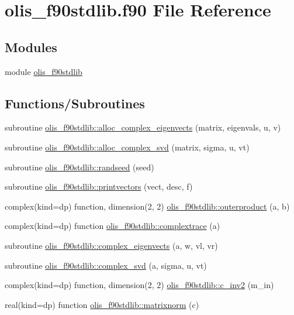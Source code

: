 \hypertarget{olis__f90stdlib_8f90}{}\section{olis\+\_\+f90stdlib.\+f90 File Reference}
\label{olis__f90stdlib_8f90}
\subsection*{Modules}
\begin{DoxyCompactItemize}
\item 
module \hyperlink{namespaceolis__f90stdlib}{olis\+\_\+f90stdlib}
\end{DoxyCompactItemize}
\subsection*{Functions/\+Subroutines}
\begin{DoxyCompactItemize}
\item 
subroutine \hyperlink{namespaceolis__f90stdlib_af0119bd404337367bc0727decf6dd89c}{olis\+\_\+f90stdlib\+::alloc\+\_\+complex\+\_\+eigenvects} (matrix, eigenvals, u, v)
\item 
subroutine \hyperlink{namespaceolis__f90stdlib_a31420ff7579f33919c00c26753b56612}{olis\+\_\+f90stdlib\+::alloc\+\_\+complex\+\_\+svd} (matrix, sigma, u, vt)
\item 
subroutine \hyperlink{namespaceolis__f90stdlib_a560e235cbabaf74da88a2ec97eda5628}{olis\+\_\+f90stdlib\+::randseed} (seed)
\item 
subroutine \hyperlink{namespaceolis__f90stdlib_a9780b39329025edfdef71ce07e250808}{olis\+\_\+f90stdlib\+::printvectors} (vect, desc, f)
\item 
complex(kind=dp) function, dimension(2, 2) \hyperlink{namespaceolis__f90stdlib_a9b646e61678500e78a9c48747a07bdf0}{olis\+\_\+f90stdlib\+::outerproduct} (a, b)
\item 
complex(kind=dp) function \hyperlink{namespaceolis__f90stdlib_aaa6e9aabcf33a6f7052e1db5aa5dcf70}{olis\+\_\+f90stdlib\+::complextrace} (a)
\item 
subroutine \hyperlink{namespaceolis__f90stdlib_a71c5b363b52932a5c69053149ac8cc25}{olis\+\_\+f90stdlib\+::complex\+\_\+eigenvects} (a, w, vl, vr)
\item 
subroutine \hyperlink{namespaceolis__f90stdlib_a81e060e6ecfde9524a9732349a818db3}{olis\+\_\+f90stdlib\+::complex\+\_\+svd} (a, sigma, u, vt)
\item 
complex(kind=dp) function, dimension(2, 2) \hyperlink{namespaceolis__f90stdlib_a162dd5131a39a62d7b95e2ebca4664a4}{olis\+\_\+f90stdlib\+::c\+\_\+inv2} (m\+\_\+in)
\item 
real(kind=dp) function \hyperlink{namespaceolis__f90stdlib_a43175b11cfecf961b5e6e597cfb2f848}{olis\+\_\+f90stdlib\+::matrixnorm} (c)
\end{DoxyCompactItemize}
